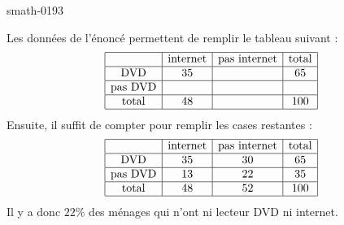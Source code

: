 
\begin{corrige}{smath-0193}

    Les données de l'énoncé permettent de remplir le tableau suivant :
    \begin{equation*}
        \begin{array}[]{|c|c|c|c|}
            \hline
            &\text{internet}&\text{pas internet}&\text{total}\\
            \hline
            \text{DVD}&35&&65\\
            \hline
            \text{pas DVD}&&&\\
            \hline
            \text{total}&48&&100\\
            \hline
        \end{array}
    \end{equation*}
    Ensuite, il suffit de compter pour remplir les cases restantes :
    \begin{equation*}
        \begin{array}[]{|c|c|c|c|}
            \hline
            &\text{internet}&\text{pas internet}&\text{total}\\
            \hline
            \text{DVD}&35&30&65\\
            \hline
            \text{pas DVD}&13&22&35\\
            \hline
            \text{total}&48&52&100\\
            \hline
        \end{array}
    \end{equation*}
    Il y a donc \( 22\%\) des ménages qui n'ont ni lecteur DVD ni internet.

\end{corrige}
